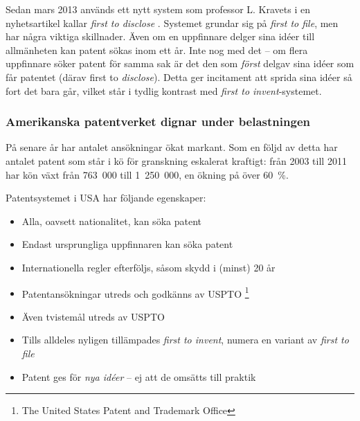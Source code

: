 Sedan mars 2013 används ett nytt system som professor L. Kravets i en nyhetsartikel kallar \emph{first to disclose} \cite{kravets}. Systemet grundar sig på \emph{first to file}, men har några viktiga skillnader. Även om en uppfinnare delger sina idéer till allmänheten kan patent sökas inom ett år. Inte nog med det -- om flera uppfinnare söker patent för samma sak är det den som \emph{först} delgav sina idéer som får patentet (därav first to \emph{disclose}). Detta ger incitament att sprida sina idéer så fort det bara går, vilket står i tydlig kontrast med \emph{first to invent}-systemet.


\subsubsection{Amerikanska patentverket dignar under belastningen}

På senare år har antalet ansökningar ökat markant. Som en följd av detta har antalet patent som står i kö för granskning eskalerat kraftigt: från 2003 till 2011 har kön växt från 763~000 till 1~250~000, en ökning på över 60~\%.

Patentsystemet i USA har följande egenskaper:

\begin{itemize}
    \item{Alla, oavsett nationalitet, kan söka patent}
    \item{Endast ursprungliga uppfinnaren kan söka patent}
    \item{Internationella regler efterföljs, såsom skydd i (minst) 20 år}
    \item{Patentansökningar utreds och godkänns av USPTO \footnote{The United States Patent and Trademark Office}}
    \item{Även tvistemål utreds av USPTO}
    \item{Tills alldeles nyligen tillämpades \emph{first to invent}, numera en variant av \emph{first to file}}
    \item{Patent ges för \emph{nya idéer} -- ej att de omsätts till praktik}
\end{itemize}
